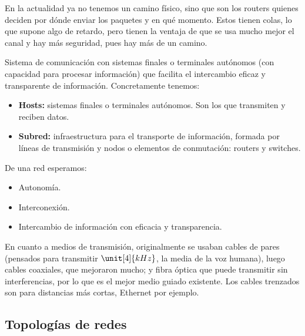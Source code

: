 En la actualidad ya no tenemos un camino físico, sino que son los routers quienes deciden por dónde enviar los paquetes y en qué momento. Estos tienen colas, lo que supone algo de retardo, pero tienen la ventaja de que se usa mucho mejor el canal y hay más seguridad, pues hay más de un camino.


\begin{definicion}[Red]
    Sistema de comunicación con sistemas finales o terminales autónomos (con capacidad para procesar información) que facilita el intercambio eficaz y transparente de información. Concretamente tenemos:
    \begin{itemize}
        \item\textbf{Hosts:} sistemas finales o terminales autónomos. Son los que transmiten y reciben datos. 
        \item\textbf{Subred:} infraestructura para el transporte de información, formada por líneas de transmisión y nodos o elementos de conmutación: routers y switches.   
    \end{itemize}
\end{definicion}

De una red esperamos:
\begin{itemize}
    \item Autonomía.
    \item Interconexión.
    \item Intercambio de información con eficacia y transparencia. 
\end{itemize}

En cuanto a medios de transmisión, originalmente se usaban cables de pares (pensados para transmitir $\unit[4]{kHz}$, la media de la voz humana), luego cables coaxiales, que mejoraron mucho; y fibra óptica que puede transmitir sin interferencias, por lo que es el mejor medio guiado existente. Los cables trenzados son para distancias más cortas, Ethernet por ejemplo. 

\subsection{Topologías de redes}

